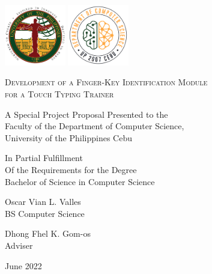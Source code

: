 \documentclass{report}
\begin{document}
\begin{titlepage}
	\centering

	\hspace{0pt}
	\vfill

	\includegraphics[width=0.2\textwidth]{upc.png}
	\includegraphics[width=0.2\textwidth]{dcs.png}
	\par\vspace{1cm}

	\textsc{Development of a Finger-Key Identification Module\\for a Touch Typing Trainer}
	\par\vspace{0.5cm}

	\hrulefill{}
	\par\vspace{0.25cm}
	A Special Project Proposal Presented to the\\
	Faculty of the Department of Computer Science,\\
	University of the Philippines Cebu

	\par\vspace{0.25cm}
	In Partial Fulfillment\\
	Of the Requirements for the Degree\\
	Bachelor of Science in Computer Science\\
	\par\vspace{0.25cm}
	\hrulefill{}
	\par\vspace{0.5cm}

	Oscar Vian L. Valles\\
	BS Computer Science
	\par\vspace{0.5cm}

	Dhong Fhel K. Gom-os\\
	Adviser
	\par\vspace{0.5cm}

	June 2022
	\vfill
	\hspace{0pt}
\end{titlepage}
\end{document}

